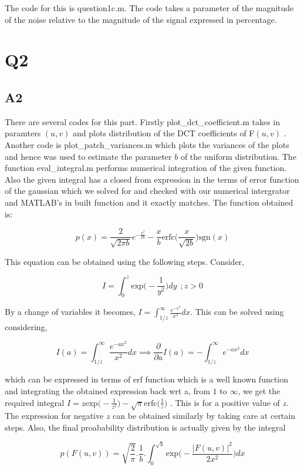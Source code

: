 \documentclass{article}
\begin{document}
The code for this is question1c.m. The code takes a parameter of the magnitude of the noise relative to the magnitude of the signal expressed in percentage.


\section*{Q2}
\subsection*{A2}

There are several codes for this part. Firstly plot\_dct\_coefficient.m takes in paramters $(u,v)$ and plots distribution of the DCT coefficients of F$(u,v)$ . Another code is plot\_patch\_variances.m which plots the variances of the plots and hence was used to estimate the parameter $b$ of the uniform distribution. The function eval\_integral.m performs numerical integration of the given function. Also the given integral has a closed from expression in the terms of error function of the gaussian which we solved for and checked with our numerical intergrator and MATLAB's in built function and it exactly matches. The function obtained is:

$$ p(x) =  \frac{2}{\sqrt{2 \pi b}} e^{-\frac{x^2}{2b}} - \frac{x}{b} \text{erfc}\big(\frac{x}{\sqrt{2b}}\big)\text{sgn}(x) $$ 

This equation can be obtained using the following steps. Consider,

$$ I = \int_0^z \text{exp} \bigg(-\frac{1}{y^2} \bigg) dy \ \ ; z > 0 $$ 
 
By a change of variables it becomes,  $ I = \int_{1/z}^{\infty} \frac{e^{-x^2}}{x^2} dx $. This can be solved using considering,

$$ I(a) = \int_{1/z}^{\infty} \frac{e^{-ax^2}}{x^2} dx  \implies \frac{\partial}{\partial a}I(a) =  -\int_{1/z}^{\infty} e^{-ax^2} dx
$$

which can be expressed in terms of $\text{erf}$ function which is a well known function and integrating the obtained expression back wrt a, from $1$ to $\infty$, we get the required integral $ I = z\text{exp}\bigg(- \frac{1}{z^2}\bigg) - \sqrt{\pi} \text{erfc}\bigg(\frac{1}{z}\bigg) $ . This is for a positive value of $z$. The expression for negative $z$ can be obtained similarly by taking care at certain steps. Also, the final proabability distribution is actually given by the integral 

$$ p(F(u,v)) = \sqrt{\frac{2}{\pi}}.\frac{1}{b}. \int_0^{\sqrt{b}} \text{exp} \bigg(- \frac{|F(u,v)|^2}{2x^2} \bigg) dx $$
\end{document}
